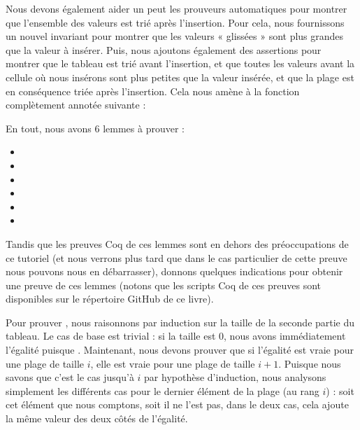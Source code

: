 

Nous devons également aider un peut les prouveurs automatiques pour montrer
que l'ensemble des valeurs est trié après l'insertion. Pour cela, nous fournissons
un nouvel invariant pour montrer que les valeurs « glissées » sont plus grandes
que la valeur à insérer. Puis, nous ajoutons également des assertions pour
montrer que le tableau est trié avant l'insertion, et que toutes les valeurs
avant la cellule où nous insérons sont plus petites que la valeur insérée, et
que la plage est en conséquence triée après l'insertion. Cela nous amène à
la fonction  complètement annotée suivante :






En tout, nous avons 6 lemmes à prouver :
\begin{itemize}
\item {}
\item {}
\item {}
\item {}
\item {}
\item {}
\end{itemize}


Tandis que les preuves Coq de ces lemmes sont en dehors des préoccupations de ce
tutoriel (et nous verrons plus tard que dans le cas particulier de cette preuve
nous pouvons nous en débarrasser), donnons quelques indications pour obtenir une
preuve de ces lemmes (notons que les scripts Coq de ces preuves sont disponibles
sur le répertoire GitHub de ce livre).


Pour prouver , nous raisonnons par induction
sur la taille de la seconde partie du tableau. Le cas de base est trivial : si
la taille est 0, nous avons immédiatement l'égalité puisque .
Maintenant, nous devons prouver que si l'égalité est vraie pour une plage de taille
$i$, elle est vraie pour une plage de taille $i+1$. Puisque nous savons que c'est
le cas jusqu'à $i$ par hypothèse d'induction, nous analysons simplement les
différents cas pour le dernier élément de la plage (au rang $i$) : soit cet élément
que nous comptons, soit il ne l'est pas, dans le deux cas, cela ajoute la même
valeur des deux côtés de l'égalité.


